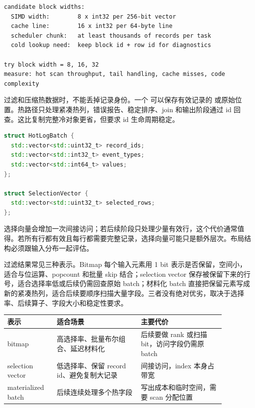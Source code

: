 \begin{lstlisting}[numbers=none,caption={AoSoA 块宽选择的推导账本}]
candidate block widths:
  SIMD width:        8 x int32 per 256-bit vector
  cache line:        16 x int32 per 64-byte line
  scheduler chunk:   at least thousands of records per task
  cold lookup need:  keep block id + row id for diagnostics

try block width = 8, 16, 32
measure: hot scan throughput, tail handling, cache misses, code complexity
\end{lstlisting}

过滤和压缩热数据时，不能丢掉记录身份。一个  可以保存有效记录的  或原始位置。热路径只处理紧凑热列，错误报告、稳定排序、join 和输出阶段通过 id 回查。这比复制完整冷对象更省，但要求 id 生命周期稳定。

\begin{lstlisting}[language=C++,caption={热列和选择向量}]
struct HotLogBatch {
  std::vector<std::uint32_t> record_ids;
  std::vector<std::int32_t> event_types;
  std::vector<std::int64_t> values;
};

struct SelectionVector {
  std::vector<std::uint32_t> selected_rows;
};
\end{lstlisting}

选择向量会增加一次间接访问；若后续阶段只处理少量有效行，这个代价通常值得。若所有行都有效且每行都需要完整记录，选择向量可能只是额外层次。布局结构必须跟输入分布一起评估。

过滤结果常见三种表示。Bitmap 每个输入元素用 1 bit 表示是否保留，空间小，适合与位运算、popcount 和批量 skip 结合；selection vector 保存被保留下来的行号，适合选择率低或后续仍需回查原始 batch；材料化 batch 直接把保留元素写成新的紧凑热列，适合后续要顺序扫描大量字段。三者没有绝对优劣，取决于选择率、后续算子、字段大小和稳定性要求。

\begin{center}
\begin{tabular}{p{0.2\linewidth}p{0.34\linewidth}p{0.34\linewidth}}
\toprule
表示 & 适合场景 & 主要代价 \\
\midrule
bitmap & 高选择率、批量布尔组合、延迟材料化 & 后续要做 rank 或扫描 bit，访问字段仍需原 batch \\
selection vector & 低选择率、保留 record id、避免复制大记录 & 间接访问，index 本身占带宽 \\
materialized batch & 后续连续处理多个热字段 & 写出成本和临时空间，需要 scan 分配位置 \\
\bottomrule
\end{tabular}
\end{center}

